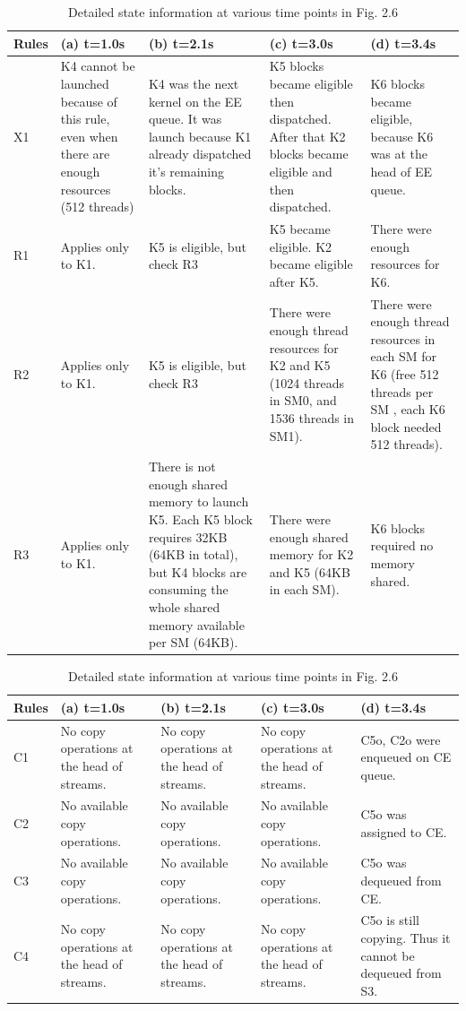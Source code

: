\documentclass[
  12pt,
  a4paperpaper,
]{report}
\begin{document}
\begin{table}[hbtp]
    \small
\begin{tabularx}{\linewidth}{|X|X|X|X|X|}
    \hline
Rules & (a) t=1.0s & (b) t=2.1s & (c) t=3.0s & (d) t=3.4s \\ \hline
X1 & K4 cannot be launched because of this rule, even when there are enough resources (512 threads) & K4 was the next kernel on the EE queue. It was launch because K1 already dispatched it's remaining blocks. & K5 blocks became eligible then dispatched. After that K2 blocks became eligible and then dispatched. & K6 blocks became eligible, because K6 was at the head of EE queue. \\ \hline
R1 & Applies only to K1. & K5 is eligible, but check R3 & K5 became eligible. K2 became eligible after K5. & There were enough resources for K6. \\ \hline
R2 & Applies only to K1. & K5 is eligible, but check R3 & There were enough thread resources for K2 and K5 (1024 threads in SM0, and 1536 threads in SM1). & There were enough thread resources in each SM for K6 (free 512 threads per SM , each K6 block needed 512 threads). \\ \hline
R3 & Applies only to K1. & There is not enough shared memory to launch K5.  Each K5 block requires 32KB (64KB in total), but K4 blocks are consuming the whole shared memory available per SM (64KB). & There were enough shared memory for K2 and K5 (64KB in each SM). & K6 blocks required no memory shared.  \\ \hline
\end{tabularx}
\label{tab:scheduler_rules2}
\caption{Detailed state information at various time points in Fig. 2.6}
\end{table}


\begin{table}[hbtp]
\small
\begin{tabularx}{\linewidth}{|X|X|X|X|X|}
    \hline
Rules & (a) t=1.0s & (b) t=2.1s & (c) t=3.0s & (d) t=3.4s \\ \hline
C1 & No copy operations at the head of streams. & No copy operations at the head of streams. & No copy operations at the head of streams. & C5o, C2o were enqueued on CE queue. \\ \hline
C2 & No available copy operations. & No available copy operations. & No available copy operations. & C5o was assigned to CE. \\ \hline
C3 & No available copy operations. & No available copy operations. & No available copy operations. & C5o was dequeued from CE. \\ \hline
C4 & No copy operations at the head of streams. & No copy operations at the head of streams. & No copy operations at the head of streams. & C5o is still copying. Thus it cannot be dequeued from S3. \\ \hline
\end{tabularx}
\label{tab:scheduler_rules3}
\caption{Detailed state information at various time points in Fig. 2.6}
\end{table}
\end{document}
